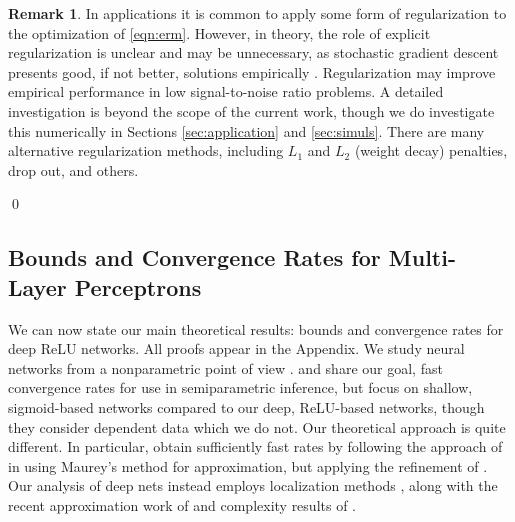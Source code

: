 \documentclass[11pt]{article}
\numberwithin{equation}{section}
\theoremstyle{definition}
\newtheorem{remarkTmp}{Remark}
\newenvironment{remark}
	{\medskip  \begin{remarkTmp} 	}
	{ 
		\renewcommand{\qedsymbol}{$\lrcorner$}
		\qed 
		\end{remarkTmp} 
	}
\begin{document}
\begin{remark}
	\label{rem:regularize}
	In applications it is common to apply some form of regularization to the optimization of \eqref{eqn:erm}. However, in theory, the role of explicit regularization is unclear and may be unnecessary, as stochastic gradient descent presents good, if not better, solutions empirically \citep[see Section \ref{sec:simuls} and][]{zhang2016understanding}. Regularization may improve empirical performance in low signal-to-noise ratio problems. A detailed investigation is beyond the scope of the current work, though we do investigate this numerically in Sections \ref{sec:application} and \ref{sec:simuls}. There are many alternative regularization methods, including $L_1$ and $L_2$ (weight decay) penalties, drop out, and others. %
\end{remark}









\subsection{Bounds and Convergence Rates for Multi-Layer Perceptrons}
	\label{sec:mlp rates}
	
	
	
We can now state our main theoretical results: bounds and convergence rates for deep ReLU networks. All proofs appear in the Appendix. We study neural networks from a nonparametric point of view \citep[e.g.,][in specific scenarios]{white1989learning, white1992artificial,schmidt2017nonparametric,Liang2018_GAN,bauer2017deep}. \cite{Chen-Shen1998_Ecma} and \cite{Chen-White1999_IEEE} share our goal, fast convergence rates for use in semiparametric inference, but focus on shallow, sigmoid-based networks compared to our deep, ReLU-based networks, though they consider dependent data which we do not. Our theoretical approach is quite different. In particular, \cite{Chen-White1999_IEEE} obtain sufficiently fast rates by following the approach of \citet{Barron1993_IEEE} in using Maurey's method \citep{pisier1981remarques} for approximation, but applying the refinement of \cite{makovoz1996random}. Our analysis of deep nets instead employs localization methods \citep{koltchinskii2000rademacher, bartlett2005local, koltchinskii2006local, Koltchinskii2011_book, liang2015learning}, along with the recent approximation work of \citet{Yarotsky2017_NN, Yarotsky2018_WP} and complexity results of \citet{Bartlett-etal2017_COLT}. 
\end{document}
